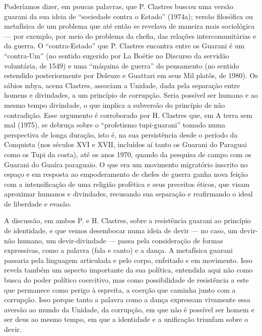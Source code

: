 \documentclass{article}
\begin{document}
Poder\'iamos dizer, em poucas palavras, que P. Clastres buscou uma
vers\~ao guarani da sua ideia de {\textquotedblleft}sociedade contra o
Estado{\textquotedblright} (1974a); vers\~ao filos\'ofica ou
metaf\'isica de um problema que at\'e ent\~ao se revelava de maneira
mais sociol\'ogica --- por exemplo, por meio do problema da chefia, das
rela\c{c}\~oes intercomunit\'arias e da guerra. O
{\textquotedblleft}contra-Estado{\textquotedblright} que P. Clastres
encontra entre os Guarani \'e um
{\textquotedblleft}contra-Um{\textquotedblright} (no sentido sugerido
por La Bo\'etie no Discurso da servid\~ao volunt\'aria, de 1549) e uma
{\textquotedblleft}m\'aquina de guerra{\textquotedblright} do
pensamento (no sentido estendido posteriormente por Deleuze e Guattari
em seus Mil plat\^os, de 1980). Os s\'abios mbya, acena Clastres,
associam a Unidade, dada pela separa\c{c}\~ao entre homens e
divindades, a um princ\'ipio de corrup\c{c}\~ao. Seria poss\'ivel ser
humano e ao mesmo tempo divindade, o que implica a subvers\~ao do
princ\'ipio de n\~ao contradi\c{c}\~ao. Esse argumento \'e corroborado
por H. Clastres que, em A terra sem mal (1975), se debru\c{c}a sobre o
{\textquotedblleft}profetismo tupi-guarani{\textquotedblright} tomado
numa perspectiva de longa dura\c{c}\~ao, isto \'e, na sua
persist\^encia desde o per\'iodo da Conquista (nos s\'eculos XVI e
XVII, inclu\'idos a\'i tanto os Guarani do Paraguai como os Tupi da
costa), at\'e os anos 1970, quando da pesquisa de campo com os Guarani
do Gua\'ira paraguaio. O que era um movimento migrat\'orio inscrito no
espa\c{c}o e em resposta ao empoderamento de chefes de guerra ganha
nova fei\c{c}\~ao com a intensifica\c{c}\~ao de uma religi\~ao
prof\'etica e seus preceitos \'eticos, que visam aproximar humanos e
divindades, recusando sua separa\c{c}\~ao e reafirmando o ideal de
liberdade e evas\~ao.

A discuss\~ao, em ambos P. e H. Clastres, sobre a resist\^encia guarani
ao princ\'ipio de identidade, e que vemos desembocar numa ideia de
devir --- no caso, um devir-n\~ao humano, um devir-divindade --- passa
pela considera\c{c}\~ao de formas expressivas, como a palavra (fala e
canto) e a dan\c{c}a. A metaf\'isica guarani passaria pela linguagem
articulada e pelo corpo, enfeitado e em movimento. Isso revela tamb\'em
um aspecto importante da sua pol\'itica, entendida aqui n\~ao como
busca do poder pol\'itico coercitivo, mas como possibilidade de
resist\^encia a este que permanece como perigo \`a espreita, a
coer\c{c}\~ao que caminha junto com a corrup\c{c}\~ao. Isso porque
tanto a palavra como a dan\c{c}a expressam vivamente essa avers\~ao ao
mundo da Unidade, da corrup\c{c}\~ao, em que n\~ao \'e poss\'ivel ser
homem e ser deus ao mesmo tempo, em que a identidade e a
unifica\c{c}\~ao triunfam sobre o devir. 
\end{document}
